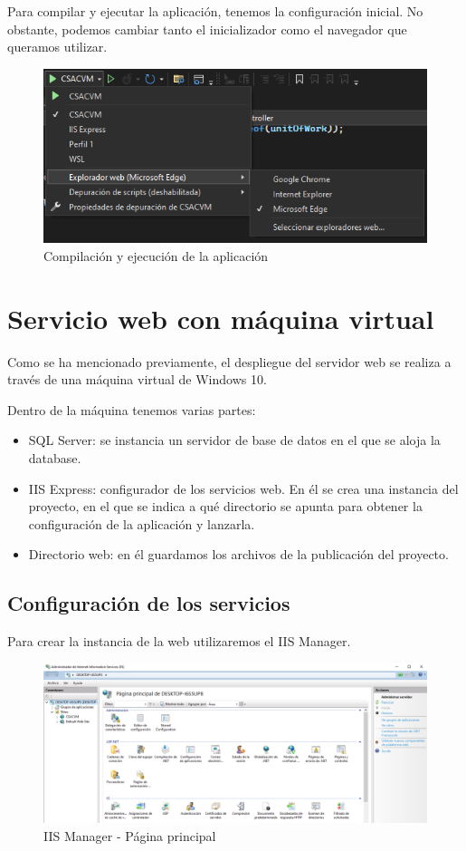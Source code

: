 \newpage
Para compilar y ejecutar la aplicación, tenemos la configuración inicial. No obstante, podemos cambiar tanto el inicializador como el navegador que queramos utilizar.
\begin{figure}
    \centering
    \includegraphics[width=\linewidth]{img/ManualProgramador/depuracion.png}
    \caption{Compilación y ejecución de la aplicación}
    
\end{figure}

\newpage
\section{Servicio web con máquina virtual}
Como se ha mencionado previamente, el despliegue del servidor web se realiza a través de una
máquina virtual de Windows 10.

Dentro de la máquina tenemos varias partes:
\begin{itemize}
\tightlist
    \item SQL Server: se instancia un servidor de base de datos en el que se aloja la database.
    \item IIS Express: configurador de los servicios web. En él se crea una instancia del proyecto, en el que se indica a qué directorio se apunta para obtener la configuración de la aplicación y lanzarla.
    \item Directorio web: en él guardamos los archivos de la publicación del proyecto.
\end{itemize}

\subsection{Configuración de los servicios}
Para crear la instancia de la web utilizaremos el IIS Manager.
\begin{figure}[H]
    \centering
    \includegraphics[width=\linewidth]{img/ManualProgramador/Despliegue01.png}
    \caption{IIS Manager - Página principal}
    
\end{figure}

